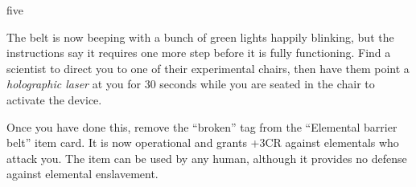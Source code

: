 \documentclass[notebook]{elementals}
\begin{document}
\begin{page}{five}

The belt is now beeping with a bunch of green lights happily blinking, but the instructions say it requires one more step before it is fully functioning. Find a scientist to direct you to one of their experimental chairs, then have them point a \emph{holographic laser} at you for 30 seconds while you are seated in the chair to activate the device.

Once you have done this, remove the ``broken'' tag from the ``Elemental barrier belt'' item card. It is now operational and grants +3CR against elementals who attack you. The item can be used by any human, although it provides no defense against elemental enslavement.

\end{page}

\endnotebook
\end{document}
